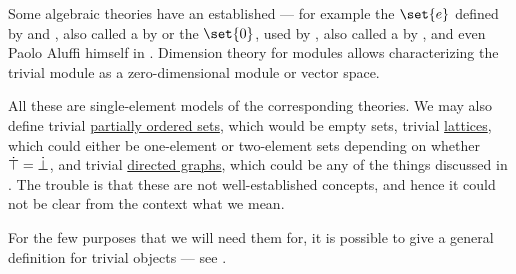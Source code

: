 \begin{remark}\label{rem:trivial_object}
  Some algebraic theories have an established  --- for example the  \( \set{ e } \) defined by  and , also called a  by  or the  \( \set{ 0 } \), used by , also called a  by ,  and even Paolo Aluffi himself in \cite[341]{Aluffi2009}. Dimension theory for modules allows characterizing the trivial module as a zero-dimensional module or vector space.

  All these are single-element models of the corresponding theories. We may also define trivial \hyperref[def:partially_ordered_set]{partially ordered sets}, which would be empty sets, trivial \hyperref[def:lattice]{lattices}, which could either be one-element or two-element sets depending on whether \( \dot\top = \dot\bot \), and trivial \hyperref[def:directed_graph]{directed graphs}, which could be any of the things discussed in . The trouble is that these are not well-established concepts, and hence it could not be clear from the context what we mean.

  For the few purposes that we will need them for, it is possible to give a general definition for trivial objects --- see .
\end{remark}

